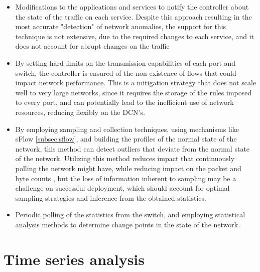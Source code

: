 \begin {itemize}
    \item Modifications to the applications and services to notify the controller about the state of the traffic on each service. Despite this approach resulting in the most accurate "detection" of network anomalies, the support 
for this technique is not extensive, due to the required changes to each service, and it does not account for abrupt changes on the traffic
    \item By setting hard limits on the transmission capabilities of each port and switch, the controller is ensured of the non existence of flows that could impact network performance. This is a mitigation strategy that
does not scale well to very large networks, since it requires the storage of the rules imposed to every port, and can potentially lead to the inefficient use of network resources, reducing flexibly on the DCN's.
    \item By employing sampling and collection techniques, using mechanisms like sFlow \ref{subsec:sflow}, and building the profiles of the normal state of the network, this method can detect outliers that deviate from the
normal state of the network. Utilizing this method reduces impact that continuously polling the network might have, while reducing impact on the packet and byte counts 
\cite {https://www.cert.org/flocon/2006/presentations/packet_sample_anomoly2006.pdf}, but the loss of information inherent to sampling may be a challenge on successful deployment, which should account for optimal sampling 
strategies and inference from the obtained statistics.
    \item Periodic polling of the statistics from the switch, and employing statistical analysis methods to determine change points in the state of the network.
\end {itemize}

\section {Time series analysis}

